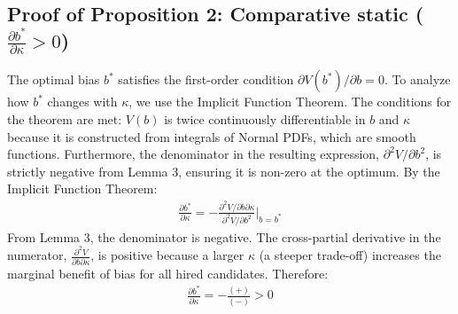 \vspace*{1em}
\subsection{Proof of Proposition 2: Comparative static ($\frac{\partial b^*}{\partial \kappa} > 0$)}

The optimal bias $b^*$ satisfies the first-order condition $\partial V(b^*)/\partial b = 0$. To analyze how $b^*$ changes with $\kappa$, we use the Implicit Function Theorem. The conditions for the theorem are met: $V(b)$ is twice continuously differentiable in $b$ and $\kappa$ because it is constructed from integrals of Normal PDFs, which are smooth functions. Furthermore, the denominator in the resulting expression, $\partial^2 V / \partial b^2$, is strictly negative from Lemma 3, ensuring it is non-zero at the optimum. By the Implicit Function Theorem:
\begin{align}
\frac{\partial b^*}{\partial \kappa} = -\frac{\partial^2 V / \partial b \partial \kappa}{\partial^2 V / \partial b^2}\bigg|_{b=b^*}
\end{align}
From Lemma 3, the denominator is negative. The cross-partial derivative in the numerator, $\frac{\partial^2 V}{\partial b \partial \kappa}$, is positive because a larger $\kappa$ (a steeper trade-off) increases the marginal benefit of bias for all hired candidates. Therefore:
\begin{align}
\frac{\partial b^*}{\partial \kappa} = -\frac{(+)}{(-)} > 0
\end{align}